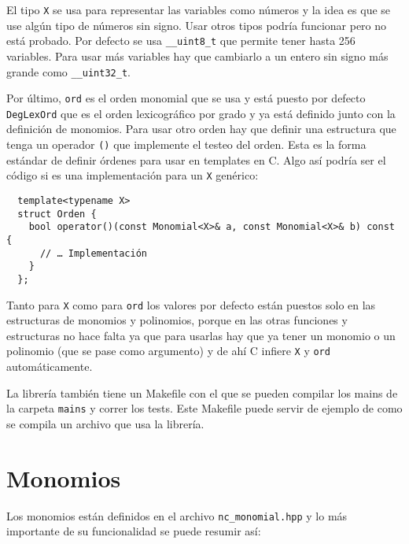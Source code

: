 \documentclass[12pt]{report}
\theoremstyle{customstyle}
\theoremstyle{factstyle}
\newcommand\cpp{C\nolinebreak[4]\hspace{-.05em}\raisebox{.4ex}{\relsize{-3}{\textbf{++}}}\xspace}
\begin{document}
El tipo \texttt{X} se usa para representar las variables como números y la idea es que se use algún tipo de números sin signo. Usar otros tipos podría funcionar pero no está probado. Por defecto se usa \texttt{\_\_uint8\_t} que permite tener hasta 256 variables. Para usar más variables hay que cambiarlo a un entero sin signo más grande como \texttt{\_\_uint32\_t}.

Por último, \texttt{ord} es el orden monomial que se usa y está puesto por defecto \texttt{DegLexOrd} que es el orden lexicográfico por grado y ya está definido junto con la definición de monomios. Para usar otro orden hay que definir una estructura que tenga un operador \texttt{()} que implemente el testeo del orden. Esta es la forma estándar de definir órdenes para usar en templates en \cpp. Algo así podría ser el código si es una implementación para un \texttt{X} genérico:

\begin{verbatim}
  template<typename X>
  struct Orden {
    bool operator()(const Monomial<X>& a, const Monomial<X>& b) const {
      // … Implementación
    }
  };
\end{verbatim}

Tanto para \texttt{X} como para \texttt{ord} los valores por defecto están puestos solo en las estructuras de monomios y polinomios, porque en las otras funciones y estructuras no hace falta ya que para usarlas hay que ya tener un monomio o un polinomio (que se pase como argumento) y de ahí \cpp infiere \texttt{X} y \texttt{ord} automáticamente.

La librería también tiene un Makefile con el que se pueden compilar los mains de la carpeta \texttt{mains} y correr los tests. Este Makefile puede servir de ejemplo de como se compila un archivo que usa la librería.

\section{Monomios}

Los monomios están definidos en el archivo \texttt{nc\_monomial.hpp} y lo más importante de su funcionalidad se puede resumir así:
\end{document}
